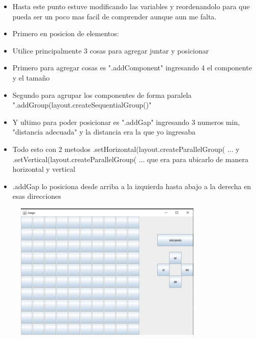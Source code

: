 \documentclass{article}
\begin{document}
		\begin{itemize}
			\item Hasta este punto estuve modificando las variables y reordenandolo para que pueda ser un poco mas facil de comprender aunque aun me falta.
			\item Primero en posicion de elementos:
			\item Utilice principalmente 3 cosas para agregar juntar y posicionar
			\item Primero para agregar cosas es ".addComponent" ingresando 4 el componente y el tamaño
			\item Segundo para agrupar los componentes de forma paralela ".addGroup(layout.createSequentialGroup()"
			\item Y ultimo para poder posicionar es ".addGap" ingresando 3 numeros min, "distancia adecuada" y la distancia era la que yo ingresaba
			\item Todo esto con 2 metodos .setHorizontal(layout.createParallelGroup(  ...   y .setVertical(layout.createParallelGroup( ...   que era para ubicarlo de manera horizontal y vertical
			\item .addGap lo posiciona desde arriba a la izquierda hasta abajo a la derecha en esas direcciones
		\end{itemize}	
	
	
	\begin{figure}[H]
		\centering
		\includegraphics[width=0.8\textwidth,keepaspectratio]{img/img_tercero.jpg}
	\end{figure}
\end{document}
